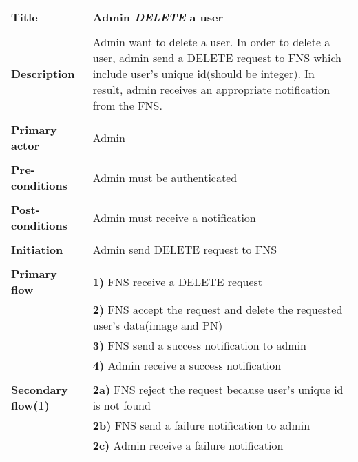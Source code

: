 \documentclass[a4paper,11pt]{article}
\begin{document}
\begin{tabular}{|p{3.5cm}|p{11.5cm}|} \hline
    \textbf{Title} &   Admin \emph{DELETE} a user
        
    \\ \hline \rowcolor{Gray} & \\ \hline
        
    \textbf{Description} &  Admin want to delete a user. In order to delete a user, admin send a DELETE request to FNS which include user's unique id(should be integer). In result, admin receives an appropriate notification from the FNS.
        
    \\ \hline \rowcolor{Gray} & \\ \hline
        
    \textbf{Primary actor} & Admin  
        
    \\ \hline \rowcolor{Gray} & \\ \hline 
          
    \textbf{Pre-conditions} &   Admin must be authenticated
        
    \\ \hline \rowcolor{Gray} & \\ \hline
         
    \textbf{Post-conditions} &   Admin must receive a notification
        
    \\ \hline \rowcolor{Gray} & \\ \hline 
         
    \textbf{Initiation} & Admin send DELETE request to FNS
        
    \\ \hline \rowcolor{Gray} & \\ \hline 
         
    \textbf{Primary flow} & 
    \textbf{1)} FNS receive a DELETE request \\&
    \textbf{2)} FNS accept the request and delete the requested user's data(image and PN) \\&
    \textbf{3)} FNS send a success notification to admin \\&
    \textbf{4)} Admin receive a success notification
        
    \\ \hline \rowcolor{Gray} & \\ \hline 
         
    \textbf{Secondary flow(1)} & 
    \textbf{2a)} FNS reject the request because user's unique id is not found \\&
    \textbf{2b)} FNS send a failure notification to admin\\&
    \textbf{2c)} Admin receive a failure notification
     

\end{tabular}
\end{document}
